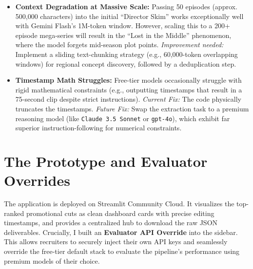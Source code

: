 \documentclass[10pt, a4paper]{article}
\begin{document}
\begin{itemize}
    \item \textbf{Context Degradation at Massive Scale:} Passing 50 episodes (approx. 500,000 characters) into the initial ``Director Skim'' works exceptionally well with Gemini Flash’s 1M-token window. However, scaling this to a 200+ episode mega-series will result in the ``Lost in the Middle'' phenomenon, where the model forgets mid-season plot points. \textit{Improvement needed:} Implement a sliding text-chunking strategy (e.g., 60,000-token overlapping windows) for regional concept discovery, followed by a deduplication step.
    \item \textbf{Timestamp Math Struggles:} Free-tier models occasionally struggle with rigid mathematical constraints (e.g., outputting timestamps that result in a 75-second clip despite strict instructions). \textit{Current Fix:} The code physically truncates the timestamps. \textit{Future Fix:} Swap the extraction task to a premium reasoning model (like \texttt{Claude 3.5 Sonnet} or \texttt{gpt-4o}), which exhibit far superior instruction-following for numerical constraints.
\end{itemize}

\section{The Prototype and Evaluator Overrides}
The application is deployed on Streamlit Community Cloud. It visualizes the top-ranked promotional cuts as clean dashboard cards with precise editing timestamps, and provides a centralized hub to download the raw JSON deliverables. Crucially, I built an \textbf{Evaluator API Override} into the sidebar. This allows recruiters to securely inject their own API keys and seamlessly override the free-tier default stack to evaluate the pipeline's performance using premium models of their choice.
\end{document}
